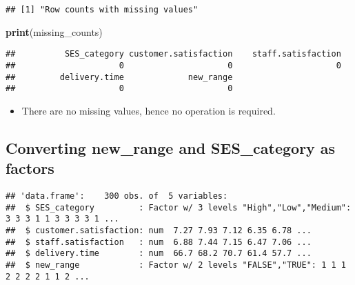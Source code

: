 \documentclass[
]{article}
\newenvironment{Shaded}{\begin{snugshade}}{\end{snugshade}}
\newcommand{\FunctionTok}[1]{\textcolor[rgb]{0.13,0.29,0.53}{\textbf{#1}}}
\newcommand{\NormalTok}[1]{#1}
\newcommand{\OtherTok}[1]{\textcolor[rgb]{0.56,0.35,0.01}{#1}}
\newcommand{\SpecialCharTok}[1]{\textcolor[rgb]{0.81,0.36,0.00}{\textbf{#1}}}
\providecommand{\tightlist}{%
  \setlength{\itemsep}{0pt}\setlength{\parskip}{0pt}}
\begin{document}
\begin{verbatim}
## [1] "Row counts with missing values"
\end{verbatim}

\begin{Shaded}
\begin{Highlighting}[]
\FunctionTok{print}\NormalTok{(missing\_counts)}
\end{Highlighting}
\end{Shaded}

\begin{verbatim}
##          SES_category customer.satisfaction    staff.satisfaction 
##                     0                     0                     0 
##         delivery.time             new_range 
##                     0                     0
\end{verbatim}

\begin{itemize}
\tightlist
\item
  There are no missing values, hence no operation is required.
\end{itemize}

\subsection{Converting new\_range and SES\_category as
factors}\label{converting-new_range-and-ses_category-as-factors}

\begin{Shaded}
\end{Shaded}

\begin{verbatim}
## 'data.frame':    300 obs. of  5 variables:
##  $ SES_category         : Factor w/ 3 levels "High","Low","Medium": 3 3 3 1 1 3 3 3 3 1 ...
##  $ customer.satisfaction: num  7.27 7.93 7.12 6.35 6.78 ...
##  $ staff.satisfaction   : num  6.88 7.44 7.15 6.47 7.06 ...
##  $ delivery.time        : num  66.7 68.2 70.7 61.4 57.7 ...
##  $ new_range            : Factor w/ 2 levels "FALSE","TRUE": 1 1 1 2 2 2 2 1 1 2 ...
\end{verbatim}
\end{document}
